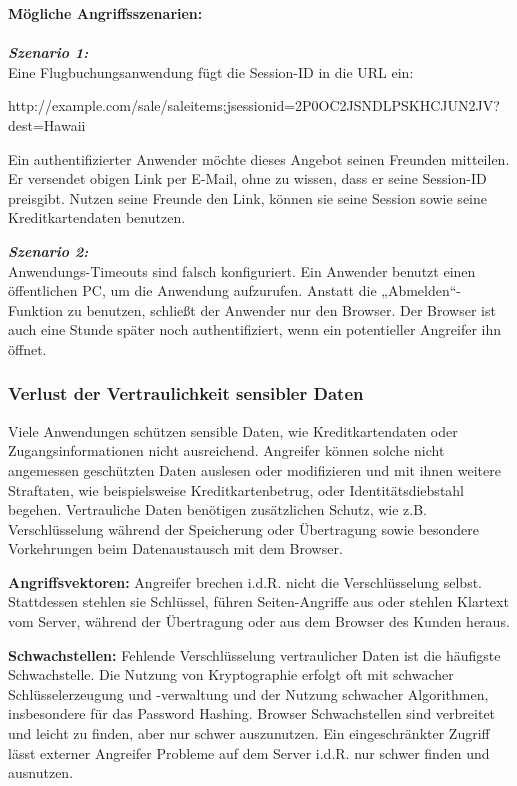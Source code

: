 \textbf{Mögliche Angriffsszenarien:}\\
\\
\textbf{\textit{Szenario 1:}}\\
Eine Flugbuchungsanwendung fügt die Session-ID in die URL ein\cite[8]{owasp17top10}:

http://example.com/sale/saleitems;jsessionid=2P0OC2JSNDLPSKHCJUN2JV?dest=Hawaii

Ein authentifizierter Anwender möchte dieses Angebot seinen Freunden mitteilen. Er versendet obigen Link per E-Mail, ohne zu wissen, dass er seine Session-ID preisgibt. Nutzen seine Freunde den Link, können sie seine Session sowie seine Kreditkartendaten benutzen.

\textbf{\textit{Szenario 2:}}\\
Anwendungs-Timeouts sind falsch konfiguriert. Ein
Anwender benutzt einen öffentlichen PC, um die Anwendung
aufzurufen. Anstatt die „Abmelden“-Funktion zu benutzen, schließt
der Anwender nur den Browser. Der Browser ist auch eine Stunde
später noch authentifiziert, wenn ein potentieller Angreifer ihn
öffnet\cite[8]{owasp17top10}.

\subsubsection{Verlust der Vertraulichkeit sensibler Daten}

Viele Anwendungen schützen sensible Daten, wie Kreditkartendaten oder Zugangsinformationen nicht ausreichend. Angreifer können solche nicht angemessen geschützten Daten auslesen oder modifizieren und mit ihnen weitere Straftaten, wie beispielsweise Kreditkartenbetrug, oder Identitätsdiebstahl begehen. Vertrauliche Daten benötigen zusätzlichen Schutz, wie z.B. Verschlüsselung während der Speicherung oder Übertragung sowie besondere Vorkehrungen beim Datenaustausch mit dem Browser\cite[6]{owasp17top10}.

\textbf{Angriffsvektoren:} Angreifer brechen i.d.R. nicht die Verschlüsselung selbst. Stattdessen stehlen sie Schlüssel, führen
Seiten-Angriffe aus oder stehlen Klartext vom
Server, während der Übertragung oder aus dem Browser des
Kunden heraus\cite[9]{owasp17top10}.

\textbf{Schwachstellen:} Fehlende Verschlüsselung vertraulicher
Daten ist die häufigste Schwachstelle. Die Nutzung von Kryptographie erfolgt oft mit schwacher Schlüsselerzeugung und -verwaltung und der Nutzung schwacher Algorithmen, insbesondere für das Password Hashing. Browser Schwachstellen sind verbreitet
und leicht zu finden, aber nur schwer auszunutzen. Ein eingeschränkter Zugriff lässt externer Angreifer Probleme auf dem Server i.d.R. nur schwer finden und ausnutzen\cite[9]{owasp17top10}.

